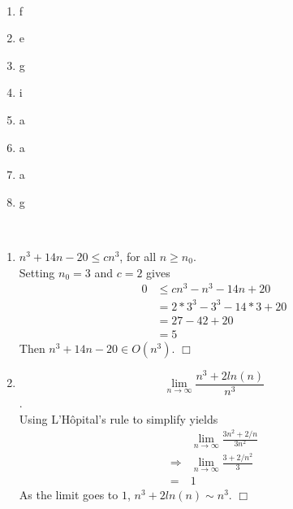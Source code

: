 \documentclass{assignment}
\begin{document}
\begin{problemlist}
\pbitem
\begin{problem}
\end{problem}
\begin{answer}
  \\
  \begin{enumerate}
  \item f
  \item e
  \item g
  \item i
  \item a
  \item a
  \item a
  \item g
  \end{enumerate}
\end{answer}

\pbitem
\begin{problem}
\end{problem}
\begin{answer}
  \\
  \begin{enumerate}
  \item $n^3 + 14n - 20 \le cn^3$, for all $n \ge n_0$.\\
    Setting $n_0=3$ and $c=2$ gives
    \begin{align*}
      0 &\le cn^3 - n^3- 14n + 20\\
      &= 2*3^3 - 3^3- 14*3 + 20\\
      &= 27 - 42 + 20\\
      &= 5
    \end{align*}
    Then $n^3 + 14n - 20 \in O(n^3)$. $\Box$
    \clearpage
  \item $$\lim_{n\to \infty} \frac{n^3 + 2 ln(n)}{n^3}$$.\\
    Using L'Hôpital's rule to simplify yields
    \begin{align*}
      &\lim_{n\rightarrow \infty} \frac{3n^2+2/n}{3n^2}\\
      \Rightarrow &\lim_{n\to \infty} \frac{3 + 2/n^2}{3}\\
      = &1
    \end{align*}
    As the limit goes to $1$, $n^3 + 2ln(n) \sim n^3$. $\Box$
  \end{enumerate}
\end{answer}



\end{problemlist}
\end{document}
